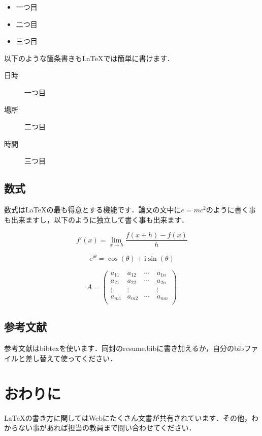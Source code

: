 \documentclass[platex,dvipdfmx]{jsarticle}
\begin{document}
\begin{itemize}
  \item 一つ目
  \item 二つ目
  \item 三つ目
\end{itemize}

以下のような箇条書きも\LaTeX では簡単に書けます．

\begin{description}
  \item[日時] 一つ目
  \item[場所] 二つ目
  \item[時間] 三つ目
\end{description}

\subsection{数式}

数式は\LaTeX の最も得意とする機能です．論文の文中に$e=mc^2$のように書く事も出来ますし，以下のように独立して書く事も出来ます．

$$ f'(x)=\lim_{x\to h} \frac{f(x+h)-f(x)}{h} $$

$$ \mathrm{e}^{\mathrm{i}\theta} = \cos(\theta) + \mathrm{i}\sin(\theta) $$

$$
A= \left(
\begin{array}{cccc}
a_{11} & a_{12} & \cdots & a_{1n} \\
a_{21} & a_{22} & \cdots & a_{2n} \\
\vdots & \vdots & \quad & \vdots \\
a_{m1} & a_{m2} & \cdots & a_{mn} \\
\end{array}
\right)
$$

\subsection{参考文献}
参考文献はbibtexを使います\cite{codd1970relational}．同封のresume.bibに書き加えるか，自分のbibファイルと差し替えて使ってください．

\section{おわりに}
\LaTeX の書き方に関してはWebにたくさん文書が共有されています．その他，わからない事があれば担当の教員まで問い合わせてください．




\end{document}
